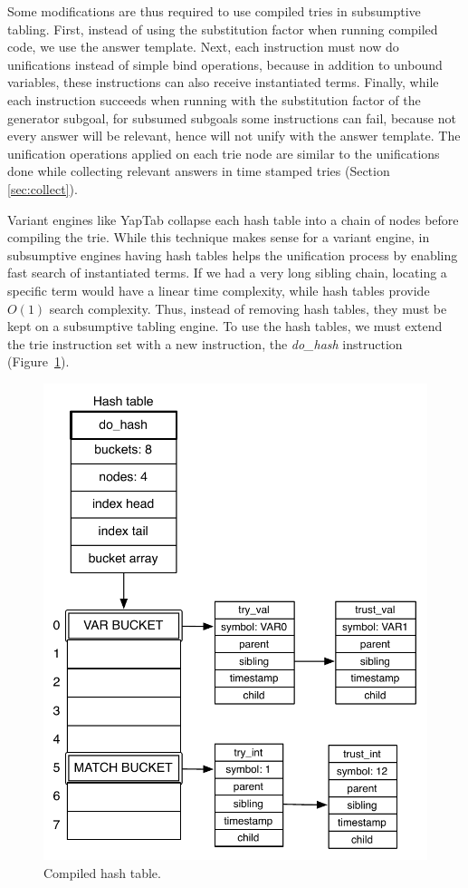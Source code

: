 Some modifications are thus required to use compiled tries in subsumptive tabling. First,
instead of using the substitution factor when running compiled code, we use the answer template.
Next, each instruction must now do unifications instead of simple bind operations,
because in addition to unbound variables, these instructions can also receive instantiated terms.
Finally, while each instruction succeeds when running with the substitution factor of the generator
subgoal, for subsumed subgoals some instructions can fail, because not every answer will be relevant,
hence will not unify with the answer template. The unification operations applied on each trie node
are similar to the unifications done while collecting relevant answers in time stamped tries
(Section \ref{sec:collect}).

Variant engines like YapTab collapse each hash table into a chain of nodes before compiling
the trie. While this technique makes sense for a variant engine, in subsumptive engines
having hash tables helps the unification process by enabling fast search of instantiated terms.
If we had a very long sibling chain, locating a specific term would have a linear time complexity, while
hash tables provide $O(1)$ search complexity.
Thus, instead of removing hash tables, they must be kept on a subsumptive tabling engine.
To use the hash tables, we must extend the trie instruction set with a new instruction,
the \textit{do\_hash} instruction (Figure~\ref{fig:compiled_hash}).

\begin{figure}[h]
  \centering
    \includegraphics[scale=0.55]{compiled_hash.pdf}
  \caption{Compiled hash table.}
  \label{fig:compiled_hash}
\end{figure}

